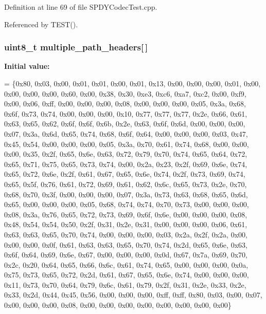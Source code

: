 Definition at line 69 of file S\+P\+D\+Y\+Codec\+Test.\+cpp.



Referenced by T\+E\+S\+T().

\subsubsection[{multiple\+\_\+path\+\_\+headers}]{\setlength{\rightskip}{0pt plus 5cm}uint8\+\_\+t multiple\+\_\+path\+\_\+headers[$\,$]}\label{SPDYCodecTest_8cpp_aae21bbfba78aecf82b987539ee7a0523}
{\bfseries Initial value\+:}
\begin{DoxyCode}
=
    \{0x80, 0x03, 0x00, 0x01, 0x01, 0x00, 0x01, 0x13, 0x00, 0x00, 0x00, 0x01,
     0x00, 0x00, 0x00, 0x00, 0x60, 0x00, 0x38, 0x30, 0xe3, 0xc6, 0xa7, 0xc2,
     0x00, 0xf9, 0x00, 0x06, 0xff, 0x00, 0x00, 0x00, 0x08, 0x00, 0x00, 0x00,
     0x05, 0x3a, 0x68, 0x6f, 0x73, 0x74, 0x00, 0x00, 0x00, 0x10, 0x77, 0x77,
     0x77, 0x2e, 0x66, 0x61, 0x63, 0x65, 0x62, 0x6f, 0x6f, 0x6b, 0x2e, 0x63,
     0x6f, 0x6d, 0x00, 0x00, 0x00, 0x07, 0x3a, 0x6d, 0x65, 0x74, 0x68, 0x6f,
     0x64, 0x00, 0x00, 0x00, 0x03, 0x47, 0x45, 0x54, 0x00, 0x00, 0x00, 0x05,
     0x3a, 0x70, 0x61, 0x74, 0x68, 0x00, 0x00, 0x00, 0x35, 0x2f, 0x65, 0x6e,
     0x63, 0x72, 0x79, 0x70, 0x74, 0x65, 0x64, 0x72, 0x65, 0x71, 0x75, 0x65,
     0x73, 0x74, 0x00, 0x2a, 0x23, 0x2f, 0x69, 0x6e, 0x74, 0x65, 0x72, 0x6e,
     0x2f, 0x61, 0x67, 0x65, 0x6e, 0x74, 0x2f, 0x73, 0x69, 0x74, 0x65, 0x5f,
     0x76, 0x61, 0x72, 0x69, 0x61, 0x62, 0x6c, 0x65, 0x73, 0x2e, 0x70, 0x68,
     0x70, 0x3f, 0x00, 0x00, 0x00, 0x07, 0x3a, 0x73, 0x63, 0x68, 0x65, 0x6d,
     0x65, 0x00, 0x00, 0x00, 0x05, 0x68, 0x74, 0x74, 0x70, 0x73, 0x00, 0x00,
     0x00, 0x08, 0x3a, 0x76, 0x65, 0x72, 0x73, 0x69, 0x6f, 0x6e, 0x00, 0x00,
     0x00, 0x08, 0x48, 0x54, 0x54, 0x50, 0x2f, 0x31, 0x2e, 0x31, 0x00, 0x00,
     0x00, 0x06, 0x61, 0x63, 0x63, 0x65, 0x70, 0x74, 0x00, 0x00, 0x00, 0x03,
     0x2a, 0x2f, 0x2a, 0x00, 0x00, 0x00, 0x0f, 0x61, 0x63, 0x63, 0x65, 0x70,
     0x74, 0x2d, 0x65, 0x6e, 0x63, 0x6f, 0x64, 0x69, 0x6e, 0x67, 0x00, 0x00,
     0x00, 0x0d, 0x67, 0x7a, 0x69, 0x70, 0x2c, 0x20, 0x64, 0x65, 0x66, 0x6c,
     0x61, 0x74, 0x65, 0x00, 0x00, 0x00, 0x0a, 0x75, 0x73, 0x65, 0x72, 0x2d,
     0x61, 0x67, 0x65, 0x6e, 0x74, 0x00, 0x00, 0x00, 0x11, 0x73, 0x70, 0x64,
     0x79, 0x6c, 0x61, 0x79, 0x2f, 0x31, 0x2e, 0x33, 0x2e, 0x33, 0x2d, 0x44,
     0x45, 0x56, 0x00, 0x00, 0x00, 0xff, 0xff, 0x80, 0x03, 0x00, 0x07, 0x00,
     0x00, 0x00, 0x08, 0x00, 0x00, 0x00, 0x00, 0x00, 0x00, 0x00, 0x00\}
\end{DoxyCode}


